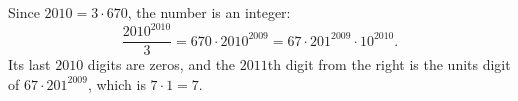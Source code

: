 Since $2010=3\cdot670$, the number is an integer:
\[\dfrac{2010^{2010}}{3}=670\cdot2010^{2009}=67\cdot201^{2009}\cdot10^{2010}.\]
Its last $2010$ digits are zeros, and the $2011$th digit from the right is the units digit of $67\cdot201^{2009}$, which is $7\cdot1=\boxed{7}$.
